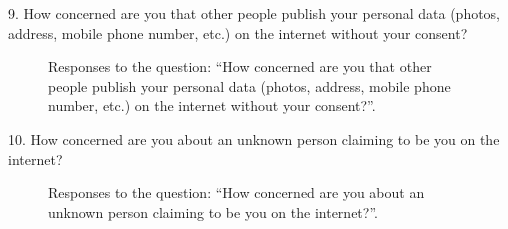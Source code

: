 9. How concerned are you that other people publish your personal data (photos, address, mobile phone number, etc.) on the internet without your consent?

\begin{figure}[H]
    \begin{center}
        \caption{Responses to the question: ``How concerned are you that other people publish your personal data (photos, address, mobile phone number, etc.) on the internet without your consent?''.}
        \label{fig:survey_s3_q9}
    \end{center}
\end{figure}

10. How concerned are you about an unknown person claiming to be you on the internet?

\begin{figure}[H]
    \begin{center}
        \caption{Responses to the question: ``How concerned are you about an unknown person claiming to be you on the internet?''.}
        \label{fig:survey_s3_q10}
    \end{center}
\end{figure}


